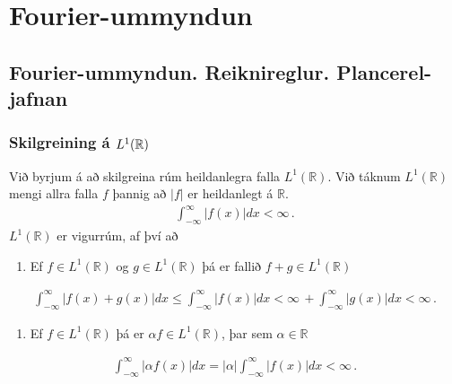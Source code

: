 \documentclass[a4paper,10pt,icelandic]{sphinxmanual}
\begin{document}
\chapter{Fourier-ummyndun}
\label{\detokenize{Kafli04:fourier-ummyndun}}\label{\detokenize{Kafli04::doc}}

\section{Fourier-ummyndun. Reiknireglur. Plancerel-jafnan}
\label{\detokenize{Kafli04:fourier-ummyndun-reiknireglur-plancerel-jafnan}}

\subsection{Skilgreining á \protect\(L^1(\mathbb R)\protect\)}
\label{\detokenize{Kafli04:skilgreining-a-l-1-mathbb-r}}
Við byrjum á að skilgreina rúm heildanlegra falla \(L^1(\mathbb R)\). Við táknum \(L^1(\mathbb R)\) mengi allra falla \(f\) þannig að \(|f|\) er heildanlegt á \(\mathbb R\).
\begin{equation*}
\begin{split}\int_{-\infty}^\infty |f(x)| dx < \infty\,.\end{split}
\end{equation*}
\(L^1(\mathbb R)\) er vigurrúm, af því að
\begin{enumerate}
\def\theenumi{\arabic{enumi}}
\def\labelenumi{\theenumi .}
\makeatletter\def\p@enumii{\p@enumi \theenumi .}\makeatother
\item {} 
Ef \(f \in L^1(\mathbb R)\) og \(g \in L^1(\mathbb R)\) þá er fallið \(f+g \in L^1(\mathbb R)\)

\end{enumerate}
\begin{equation*}
\begin{split}\int_{-\infty}^\infty |f(x)+g(x)| dx \le  \int_{-\infty}^\infty |f(x)| dx < \infty\, +\int_{-\infty}^\infty |g(x)| dx < \infty\,.\end{split}
\end{equation*}\begin{enumerate}
\def\theenumi{\arabic{enumi}}
\def\labelenumi{\theenumi .}
\makeatletter\def\p@enumii{\p@enumi \theenumi .}\makeatother
\setcounter{enumi}{1}
\item {} 
Ef \(f \in L^1(\mathbb R)\) þá er \(\alpha f \in L^1(\mathbb R)\), þar sem \(\alpha \in\mathbb R\)

\end{enumerate}
\begin{equation*}
\begin{split}\int_{-\infty}^\infty |\alpha f(x)| dx = |\alpha|\int_{-\infty}^\infty  |f(x)| dx <\infty\,.\end{split}
\end{equation*}
\end{document}
